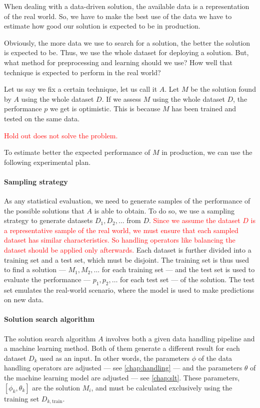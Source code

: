 When dealing with a data-driven solution, the available data is a representation of the
real world.  So, we have to make the best use of the data we have to estimate how good our
solution is expected to be in production.

Obviously, the more data we use to search for a solution, the better the solution is
expected to be.  Thus, we use the whole dataset for deploying a solution.  But, what
method for preprocessing and learning should we use?  How well that technique is
expected to perform in the real world?

Let us say we fix a certain technique, let us call it $A$.  Let $M$ be the solution found
by $A$ using the whole dataset $D$.  If we assess $M$ using the whole dataset $D$, the
performance $p$ we get is optimistic.  This is because $M$ has been trained and tested
on the same data.

\textcolor{red}{Hold out does not solve the problem.}

To estimate better the expected performance of $M$ in production, we can use the following
experimental plan.

\paragraph{Sampling strategy}  As any statistical evaluation, we need to generate samples
of the performance of the possible solutions that $A$ is able to obtain. To do so, we use
a sampling strategy to generate datasets $D_1, D_2, \ldots$ from $D$.  \textcolor{red}{%
Since we assume the dataset $D$ is a representative sample of the real world, we must
ensure that each sampled dataset has similar characteristics.  So handling operators like
balancing the dataset should be applied only afterwards.}  Each
dataset is further divided into a training set and a test set, which must be disjoint.
The training set is thus used to find a solution --- $M_1, M_2, \ldots$ for each
training set --- and the test set is used to evaluate the performance --- $p_1, p_2,
\ldots$ for each test set --- of the solution.  The test set emulates the real-world
scenario, where the model is used to make predictions on new data.

\paragraph{Solution search algorithm}  The solution search algorithm $A$ involves both a
given data handling pipeline and a machine learning method.  Both of them generate a
different result for each dataset $D_k$ used as an input.  In other words, the parameters
$\phi$ of the data handling operators are adjusted --- see \cref{chap:handling} --- and the
parameters $\theta$ of the machine learning model are adjusted --- see \cref{chap:slt}.
These parameters, $\left[\phi_k, \theta_k\right]$ are the solution $M_i$, and must be
calculated exclusively using the training set $D_{k,\text{train}}$.

